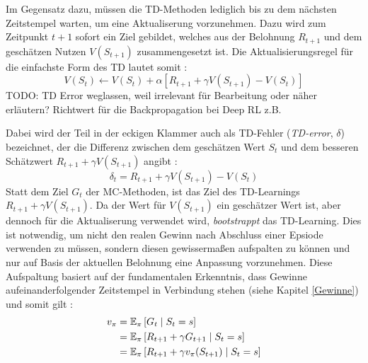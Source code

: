 Im Gegensatz dazu, müssen die TD-Methoden lediglich bis zu dem nächsten Zeitstempel warten, um eine Aktualiserung vorzunehmen. Dazu wird zum Zeitpunkt $t+1$ sofort ein Ziel gebildet, welches aus der Belohnung $R_{t+1}$ und dem geschätzen Nutzen $V(S_{t+1})$ zusammengesetzt ist. Die Aktualisierungsregel für die einfachste Form des TD lautet somit \cite[S.~120]{Sutton1998}:
\begin{equation}\label{eq:tdupdate}
    V(S_t) \gets V(S_t) + \alpha \left[R_{t+1} + \gamma V(S_{t+1}) - V(S_t)\right]
\end{equation}
TODO: TD Error weglassen, weil irrelevant für Bearbeitung oder näher erläutern? Richtwert für die Backpropagation bei Deep RL z.B. 
\par 
Dabei wird der Teil in der eckigen Klammer auch als TD-Fehler (\textit{TD-error}, $\delta$) bezeichnet, der die Differenz zwischen dem geschätzen Wert $S_t$ und dem besseren Schätzwert $R_{t+1} + \gamma V(S_{t+1})$ angibt \cite[S.~121]{Sutton1998}:
\begin{equation}\label{eq:tderror}
    \delta_t = R_{t+1} + \gamma V(S_{t+1}) - V(S_t)
\end{equation}
Statt dem Ziel $G_t$ der MC-Methoden, ist das Ziel des TD-Learnings $R_{t+1} + \gamma V(S_{t+1})$. Da der Wert für $V(S_{t+1})$ ein geschätzer Wert ist, aber dennoch für die Aktualiserung verwendet wird, \textit{bootstrappt} das TD-Learning. Dies ist notwendig, um nicht den realen Gewinn nach Abschluss einer Epsiode verwenden zu müssen, sondern diesen gewissermaßen aufspalten zu können und nur auf Basis der aktuellen Belohnung eine Anpassung vorzunehmen. Diese Aufspaltung basiert auf der fundamentalen Erkenntnis, dass Gewinne aufeinanderfolgender Zeitstempel in Verbindung stehen (siehe Kapitel \ref{Gewinne}) und somit gilt \cite[S.~120]{Sutton1998}: 
\begin{equation}\label{eq:targets}
\begin{aligned}
v_\pi &= \operatorname{\mathbb{E}}_\pi\left[G_t \mid S_t = s \right] \\
&= \operatorname{\mathbb{E}}_\pi\left[R_{t+1} + \gamma G_{t+1} \mid S_t = s \right] \\
        &= \operatorname{\mathbb{E}}_\pi\left[R_{t+1} + \gamma v_\pi(S_{t+1}) \mid S_t = s \right]
\end{aligned}
\end{equation}

